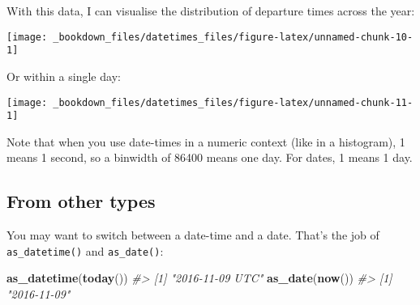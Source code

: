 \documentclass[]{book}
\newenvironment{Shaded}{\begin{snugshade}}{\end{snugshade}}
\newcommand{\KeywordTok}[1]{\textcolor[rgb]{0.13,0.29,0.53}{\textbf{{#1}}}}
\newcommand{\DataTypeTok}[1]{\textcolor[rgb]{0.13,0.29,0.53}{{#1}}}
\newcommand{\DecValTok}[1]{\textcolor[rgb]{0.00,0.00,0.81}{{#1}}}
\newcommand{\StringTok}[1]{\textcolor[rgb]{0.31,0.60,0.02}{{#1}}}
\newcommand{\CommentTok}[1]{\textcolor[rgb]{0.56,0.35,0.01}{\textit{{#1}}}}
\newcommand{\NormalTok}[1]{{#1}}
\begin{document}
With this data, I can visualise the distribution of departure times
across the year:

\begin{Shaded}
\end{Shaded}

\begin{center}\texttt{[image: \_bookdown\_files/datetimes\_files/figure-latex/unnamed-chunk-10-1]} \end{center}

Or within a single day:

\begin{Shaded}
\end{Shaded}

\begin{center}\texttt{[image: \_bookdown\_files/datetimes\_files/figure-latex/unnamed-chunk-11-1]} \end{center}

Note that when you use date-times in a numeric context (like in a
histogram), 1 means 1 second, so a binwidth of 86400 means one day. For
dates, 1 means 1 day.

\subsection{From other types}\label{from-other-types}

You may want to switch between a date-time and a date. That's the job of
\texttt{as\_datetime()} and \texttt{as\_date()}:

\begin{Shaded}
\begin{Highlighting}[]
\KeywordTok{as_datetime}\NormalTok{(}\KeywordTok{today}\NormalTok{())}
\CommentTok{#> [1] "2016-11-09 UTC"}
\KeywordTok{as_date}\NormalTok{(}\KeywordTok{now}\NormalTok{())}
\CommentTok{#> [1] "2016-11-09"}
\end{Highlighting}
\end{Shaded}
\end{document}
